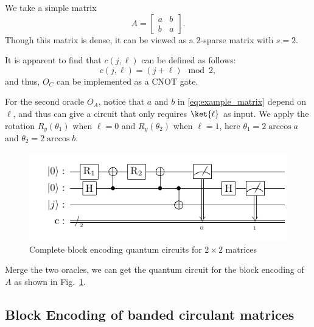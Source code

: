 \documentclass{article}
\begin{document}
We take a simple matrix
\begin{equation}
  A =
  \begin{bmatrix}
    a & b \\
    b & a
  \end{bmatrix}.\label{eq:example_matrix}
\end{equation}
Though this matrix is dense, it can be viewed as a $2$-sparse matrix with $s=2$.

It is apparent to find that $c(j,\ell)$ can be defined as follows:
\begin{equation}
  c(j,\ell) =(j + \ell) \mod 2,\label{eq:equation12}
\end{equation}
and thus, $O_C$ can be implemented as a CNOT gate.

For the second oracle $O_A$, notice that $a$ and $b$ in \ref{eq:example_matrix} depend on $\ell$, and thus can give a circuit that only requires $\ket{\ell}$ as input. We apply the rotation $R_y(\theta_1)$ when $\ell=0$ and $R_y(\theta_2)$ when $\ell=1$, here $\theta_1 = 2\arccos a$ and $\theta_2 = 2\arccos b$.

\begin{figure}[htbp]
  \centering
  \includegraphics{pdf/2x2_circuit}
  \caption{
    Complete block encoding quantum circuits for $2\times2$ matrices
  }
  \label{fig:2x2_circuit}
\end{figure}

Merge the two oracles, we can get the quantum circuit for the block encoding of $A$ as shown in Fig.~\ref{fig:2x2_circuit}.

\subsection{Block Encoding of banded circulant matrices}
\end{document}
